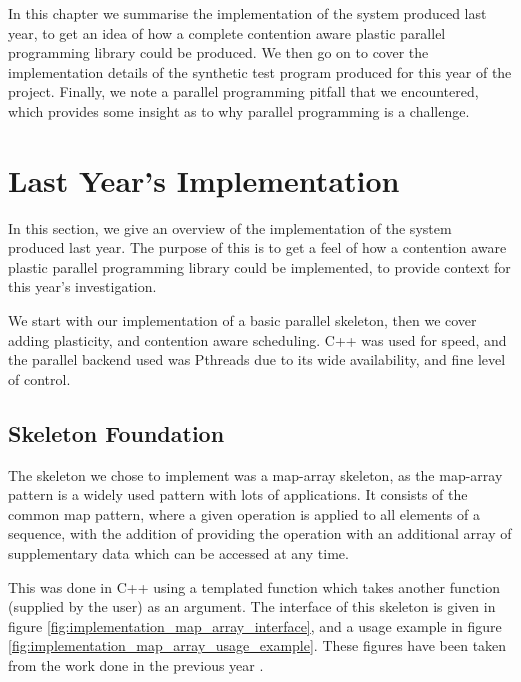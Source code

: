 
In this chapter we summarise the implementation of the system produced last year, to get an idea of how a complete contention aware plastic parallel programming library could be produced. We then go on to cover the implementation details of the synthetic test program produced for this year of the project. Finally, we note a parallel programming pitfall that we encountered, which provides some insight as to why parallel programming is a challenge.



\section{Last Year's Implementation}
\label{section:implementation:last_years_implementation}

In this section, we give an overview of the implementation of the system produced last year. The purpose of this is to get a feel of how a contention aware plastic parallel programming library could be implemented, to provide context for this year's investigation.

We start with our implementation of a basic parallel skeleton, then we cover adding plasticity, and contention aware scheduling. C++ was used for speed, and the parallel backend used was Pthreads due to its wide availability, and fine level of control. 



\subsection{Skeleton Foundation}
\label{section:implementation:skeleton_foundation}

The skeleton we chose to implement was a map-array skeleton, as the map-array pattern is a widely used pattern with lots of applications. It consists of the common map pattern, where a given operation is applied to all elements of a sequence, with the addition of providing the operation with an additional array of supplementary data which can be accessed at any time.

This was done in C++ using a templated function which takes another function (supplied by the user) as an argument. The interface of this skeleton is given in figure \ref{fig:implementation_map_array_interface}, and a usage example in figure \ref{fig:implementation_map_array_usage_example}. These figures have been taken from the work done in the previous year \cite{me}.



